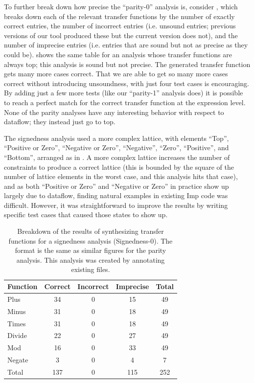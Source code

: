 \documentclass[10pt,conference]{IEEEtran}
\begin{document}
To further break
down how precise the ``parity-0'' analysis is, consider , which breaks
down each of the relevant transfer functions by the number of exactly correct
entries, the number of incorrect entries (i.e. unsound entries; previous
versions of our tool produced these but the current version does not), and the
number of imprecise entries (i.e. entries that are sound but not as precise
as they could be).  shows the same table for an analysis whose
transfer functions are always top; this analysis is sound but not precise.
The generated transfer function gets many more cases correct.
That we are able to get so many more cases correct
without introducing unsoundness, with just four test cases
is encouraging. By adding just a few more tests (like our ``parity-1''
analysis does) it is possible to reach a perfect match for the correct
transfer function at the expression level. None of the parity analyses
have any interesting behavior with respect to dataflow; they instead
just go to top.

The signedness analysis used a more complex lattice, with elements 
``Top'', ``Positive or Zero'', ``Negative or Zero'', ``Negative'',
``Zero'', ``Positive'', and ``Bottom'', arranged as in .  
A more complex lattice increases the number of constraints to produce a 
correct lattice (this is bounded by the square of the number of lattice elements in the 
worst case, and this analysis hits that case), and as both ``Positive or Zero''
and ``Negative or Zero'' in practice show up largely due to dataflow, finding
natural examples in existing Imp code was difficult.  However, it was straightforward
to improve the results by writing specific test cases that caused those states to show up.

\begin{table}
\centering
 \begin{tabular}{l c c c c }
  
  Function & Correct & Incorrect & Imprecise & Total\\ 
  \midrule
  Plus & 34 & 0 & 15 & 49 \\
  Minus & 31 & 0 & 18 & 49 \\
  Times & 31 & 0 & 18 & 49 \\
  Divide & 22 & 0 & 27 & 49 \\
  Mod & 16 & 0 & 33 & 49 \\
  Negate & 3 & 0 & 4 & 7 \\
  \midrule
  Total & 137 & 0 & 115 & 252 \\
 \end{tabular}
 \caption{Breakdown of the results of synthesizing transfer functions
 for a signedness analysis (Signedness-0). The format is the same
 as similar figures for the parity analysis. This analysis was
 created by annotating existing files.}
 \label{tab-sign0}
\end{table}
\end{document}
